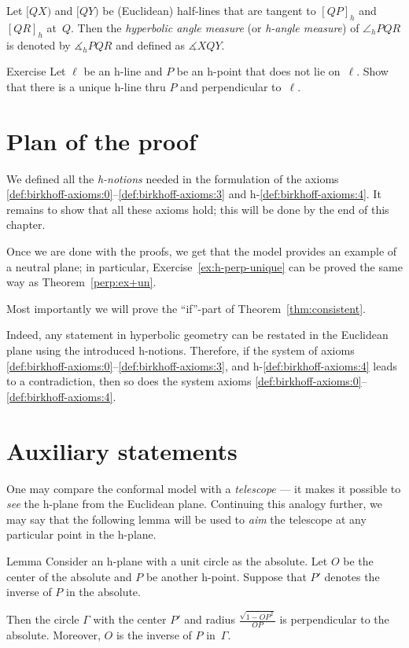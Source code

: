 Let $[QX)$ and $[QY)$ be (Euclidean) half-lines 
that are tangent to $[QP]_h$ and $[QR]_h$ 
at~$Q$.
Then the \emph{hyperbolic angle measure} (or \emph{h-angle measure}) of $\angle_h PQR$ is denoted by
$\measuredangle_h PQR$ and defined as
$\measuredangle XQY$.

\begin{thm}{Exercise}\label{ex:h-perp-unique}
Let $\ell$ be an h-line and $P$ be an h-point that does not lie on~$\ell$.
Show that there is a unique h-line thru $P$ and perpendicular to~$\ell$.
\end{thm}

\section{Plan of the proof}

We defined all the {}\emph{h-notions} needed in the formulation of the axioms \ref{def:birkhoff-axioms:0}--\ref{def:birkhoff-axioms:3} and h-\ref{def:birkhoff-axioms:4}.
It remains to show that all these axioms hold; 
this will be done by the end of this chapter.

Once we are done with the proofs, 
we get that the model provides an example of a neutral plane; 
in particular, Exercise~\ref{ex:h-perp-unique} can be proved the same way as Theorem~\ref{perp:ex+un}.

Most importantly we will prove the ``if''-part of Theorem~\ref{thm:consistent}.

Indeed, any statement in hyperbolic geometry can be restated in the Euclidean plane using the introduced h-notions.
Therefore, if the system of axioms \ref{def:birkhoff-axioms:0}--\ref{def:birkhoff-axioms:3}, and h-\ref{def:birkhoff-axioms:4} leads to a contradiction, then so does the system axioms \ref{def:birkhoff-axioms:0}--\ref{def:birkhoff-axioms:4}.

\section{Auxiliary statements}

One may compare the conformal model with a {}\emph{telescope} --- it makes it possible to {}\emph{see} the h-plane from the Euclidean plane.
Continuing this analogy further, we may say that the following lemma will be used to {}\emph{aim} the telescope at any particular point in the h-plane.

\begin{thm}{Lemma}\label{lem:P-->O} 
Consider an h-plane with a unit circle as the absolute.
Let $O$ be the center of the absolute and $P$ be another h-point.
Suppose that $P'$ denotes the inverse of $P$ in the absolute.

Then the circle $\Gamma$ with the center $P'$ and radius 
$\tfrac{\sqrt{1-OP^2}}{OP}$
is perpendicular to the absolute.
Moreover, $O$ is the inverse of $P$ in~$\Gamma$. 
\end{thm}

